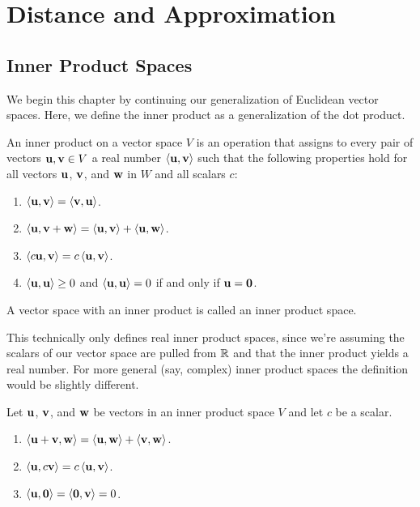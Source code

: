 \documentclass[../m073main.tex]{subfiles}
\begin{document}
\chapter{Distance and Approximation}
\section{Inner Product Spaces}
We begin this chapter by continuing our generalization of Euclidean vector spaces.
Here, we define the inner product as a generalization of the dot product.

\begin{definition}
	An inner product on a vector space $V$ is an operation that assigns to every pair of vectors $\mathbf{u}, \mathbf{v} \in V$ a real number $\left< \mathbf{u}, \mathbf{v} \right>$ such that the following properties hold for all vectors $\mathbf{u}$, $\mathbf{v}$, and $\mathbf{w}$ in $W$ and all scalars $c$:
	\begin{enumerate}[topsep=0pt]
		\item $\left< \mathbf{u}, \mathbf{v} \right> = \left< \mathbf{v}, \mathbf{u} \right>$.
		\item $\left< \mathbf{u}, \mathbf{v} + \mathbf{w} \right> = \left< \mathbf{u}, \mathbf{v} \right> + \left< \mathbf{u}, \mathbf{w} \right>$.
		\item $\left< c \mathbf{u}, \mathbf{v} \right> = c \left< \mathbf{u}, \mathbf{v} \right>$.
		\item $\left< \mathbf{u}, \mathbf{u} \right> \geq 0$ and $\left< \mathbf{u}, \mathbf{u} \right> = 0$ if and only if $\mathbf{u} = \mathbf{0}$.
	\end{enumerate}
	A vector space with an inner product is called an inner product space.
\end{definition}

This technically only defines real inner product spaces, since we're assuming the scalars of our vector space are pulled from $\mathbb{R}$ and that the inner product yields a real number.
For more general (say, complex) inner product spaces the definition would be slightly different.

\begin{theorem}
	Let $\mathbf{u}$, $\mathbf{v}$, and $\mathbf{w}$ be vectors in an inner product space $V$ and let $c$ be a scalar.
	\begin{enumerate}[label=(\alph*)]
		\item $\left< \mathbf{u} + \mathbf{v}, \mathbf{w} \right> = \left< \mathbf{u}, \mathbf{w} \right> + \left< \mathbf{v}, \mathbf{w} \right>$.
		\item $\left< \mathbf{u}, c \mathbf{v} \right> = c \left< \mathbf{u}, \mathbf{v} \right>$.
		\item $\left< \mathbf{u}, \mathbf{0} \right> = \left< \mathbf{0}, \mathbf{v} \right> = 0$.
	\end{enumerate}
\end{theorem}
\end{document}
